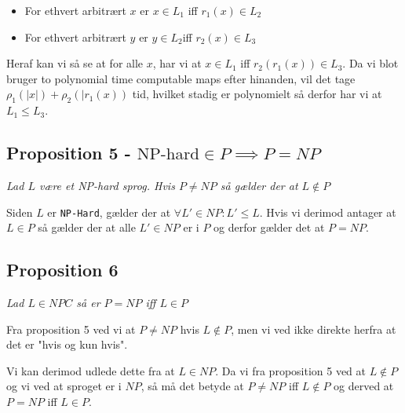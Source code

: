\documentclass[danish,a4paper,article,12pt]{article}
\begin{document}
\begin{itemize}
\item For ethvert arbitrært $x$ er $x\in L_1$ iff $r_1(x) \in L_2$
\item For ethvert arbitrært $y$ er $y\in L_2$iff $r_2(x) \in L_3$
\end{itemize}

Heraf kan vi så se at for alle $x$, har vi at $x \in L_1$ iff $r_2(r_1(x)) \in L_3$. Da vi blot bruger to polynomial time computable maps efter hinanden, vil det tage $\rho_1(|x|)+\rho_2(|r_1(x))$ tid, hvilket stadig er polynomielt så derfor har vi at $L_1 \leq L_3$.

\subsection{Proposition 5 - $\text{NP-hard} \in P \implies P=NP$}
\emph{Lad $L$ være et NP-hard sprog. Hvis $P\neq NP$ så gælder der at $L\notin P$}

Siden $L$ er \texttt{NP-Hard}, gælder der at $\forall L' \in NP: L' \leq L$. Hvis vi derimod antager at $L\in P$ så gælder der at alle $L'\in NP$ er i $P$ og derfor gælder det at $P=NP$.

\subsection{Proposition 6}
\emph{Lad $L \in NPC$ så er $P=NP$ iff $L\in P$}

Fra proposition 5 ved vi at $P\neq NP$ hvis $L\notin P$, men vi ved ikke direkte herfra at det er "hvis og kun hvis".

Vi kan derimod udlede dette fra at $L\in NP$. Da vi fra proposition 5 ved at $L\notin P$ og vi ved at sproget er i $NP$, så må det betyde at $P\neq NP$ iff $L\notin P$ og derved at $P=NP$ iff $L\in P$.
\end{document}
